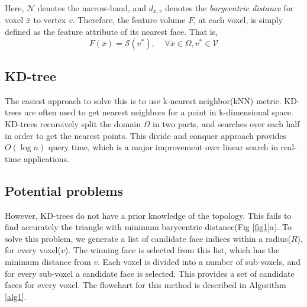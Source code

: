 \documentclass[11pt]{article}
\newcommand{\Ff}{\mathcal{F}}
\newcommand{\Vv}{\mathcal{V}}
\begin{document}
 Here, $\mathcal{N}$ denotes the narrow-band, and $d_{\bar{x},v}$ denotes the \emph{barycentric distance} for voxel $\bar{x}$ to vertex $v$. Therefore, the feature volume $F$, at each voxel, is simply defined as the feature attribute of its nearest face. That is,
 \vspace{-5pt}
\begin{equation}
   F(\bar{x}) = \mathcal{S}(v^{*}), \; \; \; \; \forall \bar{x} \in \Omega, v^{*} \in \mathcal{V}
 \label{eq1}
\end{equation}

\printnomenclature
{}%
%
%
\nomenclature{$\Vv$}{vertices $\in M$}%
\nomenclature{$\Ff$}{faces $\in M$}%
%
%

 \subsection{KD-tree} 
 The easiest approach to solve this is to use k-nearest neighbor(kNN) metric. KD-trees\cite{KD} are often used to get nearest neighbors for a point in k-dimensional space. KD-trees recursively split the domain $\Omega$ in two parts, and searches over each half in order to get the nearest points. This divide and conquer approach provides $O(\log n)$ query time, which  is a major improvement over linear search in real-time applications. 
 
 \subsection{Potential problems} 
 However, KD-trees do not have a prior knowledge of the topology. This fails to find accurately the triangle with minimum barycentric distance(Fig \ref{fig1}a). To solve this problem, we generate a list of candidate face indices within a radius($R$), for every voxel($v$). The winning face is selected from this list, which has the minimum distance from $v$. Each voxel is divided into a number of sub-voxels, and for every sub-voxel a candidate face is selected. This provides a set of candidate faces for every voxel. The flowchart for this method is described in Algorithm \ref{alg1}.
 
\end{document}
